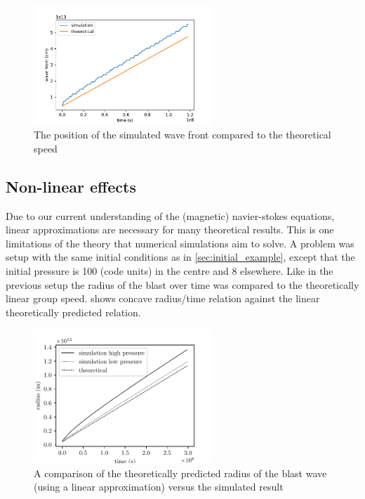 \documentclass{article}
\begin{document}
\begin{figure}[h]
	\centering
	\includegraphics[width=0.6\textwidth]{figures/wavefront_position}
	\caption{The position of the simulated wave front compared to the theoretical speed}
	\label{fig:wave_front_speed}
\end{figure}

\subsection{Non-linear effects} \label{sec:nonlinear_effects}
Due to our current understanding of the (magnetic) navier-stokes equations, linear approximations are necessary for many theoretical results. 
This is one limitations of the theory that numerical simulations aim to solve.
A problem was setup with the same initial conditions as in \cref{sec:initial_example}, except that the initial pressure is 100 (code units) in the centre and 8 elsewhere. 
Like in the previous setup the radius of the blast over time was compared to the theoretically linear group speed.
 shows concave radius/time relation against the linear theoretically predicted relation. 
\begin{figure}[h]
	\centering
	\includegraphics[width=0.6\textwidth]{figures/non_linear_effects.pdf}
	\caption{A comparison of the theoretically predicted radius of the blast wave (using a linear approximation) versus the simulated result}
	\label{fig:non_linear_effects}
\end{figure}
\end{document}
